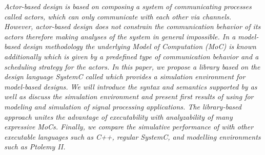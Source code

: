 {\itshape
Actor-based design is based on composing a system of communicating processes called \emph{actors}, which can only communicate with each other via channels.
However, \emph{actor-based design} does not constrain the communication behavior of its actors therefore making analyses of the system in general impossible.
In a \emph{model-based design} methodology the underlying \emph{Model of Computation} (MoC) is known additionally which is given by a predefined type of communication behavior and a scheduling strategy for the actors.
In this paper, we propose a library based on the design language SystemC called \SysteMoC{} which provides a simulation environment for model-based designs.
We will introduce the syntax and semantics supported by \SysteMoC{} as well as discuss the simulation environment and present first results of using \SysteMoC{} for modeling and simulation of signal processing applications.
The library-based approach unites the advantage of executability with analyzability of many expressive MoCs.
Finally, we compare the simulative performance of \SysteMoC{} with other executable languages such as C++, regular SystemC, and modelling environments such as Ptolemy II.
}

